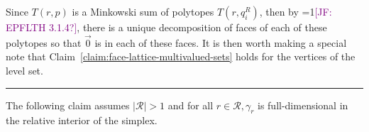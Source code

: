 \documentclass[12pt]{article}
\newcommand{\Comments}{1}
\newcommand{\mynote}[2]{\ifnum\Comments=1\textcolor{#1}{#2}\fi}
\newcommand{\jessie}[1]{\mynote{purple}{[JF: #1]}}
\newcommand{\simplex}{\Delta_\Y}
\newcommand{\R}{\mathcal{R}}
\newcommand{\Y}{\mathcal{Y}}
\newcommand{\inter}[1]{\mathrm{int}(#1)}%
\newtheorem{claim}{Claim}
\begin{document}
Since $T(r,p)$ is a Minkowski sum of polytopes $T(r,q^R_i)$, then by \jessie{EPFLTH 3.1.4?}, there is a unique decomposition of faces of each of these polytopes so that $\vec 0$ is in each of these faces.
It is then worth making a special note that Claim~\ref{claim:face-lattice-multivalued-sets} holds for the vertices of the level set.

\bigskip
\hrule
\bigskip

The following claim assumes $|\R| > 1$ and for all $r \in \R, \gamma_r$ is full-dimensional in the relative interior of the simplex.
%
%
%

%	
%	
%	
\end{document}
